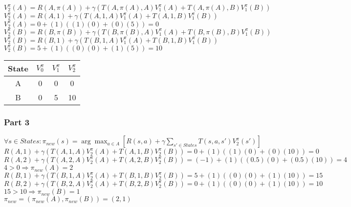\documentclass{article}
\begin{document}
$V^{\pi}_2(A) = R(A, \pi (A)) + \gamma (T(A, \pi (A), A)V^{\pi}_1(A) + T(A, \pi (A), B)V^{\pi}_1(B))$\\

$V^{\pi}_2(A) = R(A, 1) + \gamma (T(A, 1, A)V^{\pi}_1(A) + T(A, 1, B)V^{\pi}_1(B))$\\

$V^{\pi}_2(A) = 0 + (1)((1)(0) + (0)(5)) = 0$\\

$V^{\pi}_2(B) = R(B, \pi (B)) + \gamma (T(B, \pi (B), A)V^{\pi}_1(A) + T(B, \pi (B), B)V^{\pi}_1(B))$\\

$V^{\pi}_2(B) = R(B, 1) + \gamma (T(B, 1, A)V^{\pi}_1(A) + T(B, 1, B)V^{\pi}_1(B))$\\

$V^{\pi}_2(B) = 5 + (1)((0)(0) + (1)(5)) = 10$\\

\begin{table}[!h]
    \centering
    \small
    \begin{tabular}{cccc}
        \hline
         State & $V^{\pi}_0$ & $V^{\pi}_1$ & $V^{\pi}_2$\\
         \hline
         A & 0 & 0 & 0\\
         B & 0 & 5 & 10\\
        \hline
    \end{tabular}
    \label{tab:my_label}
\end{table}

\subsubsection*{Part 3}

$\forall s \in States: \pi_{new}(s) = \arg\max_{a \in A}[R(s,a) + \gamma \sum_{s' \in States} T(s, a, s')V^{\pi}_2(s')]$\\

\noindent 
$R(A, 1) + \gamma (T(A, 1, A)V^{\pi}_2(A) + T(A, 1, B)V^{\pi}_2(B)) = 0 + (1)((1)(0) + (0)(10)) = 0$\\

\noindent 
$R(A, 2) + \gamma (T(A, 2, A)V^{\pi}_2(A) + T(A, 2, B)V^{\pi}_2(B)) = (-1) + (1)((0.5)(0) + (0.5)(10)) = 4$\\

\noindent 
$4 > 0 \Longrightarrow \pi_{new}(A) = 2$\\

\noindent 
$R(B, 1) + \gamma (T(B, 1, A)V^{\pi}_2(A) + T(B, 1, B)V^{\pi}_2(B)) = 5 + (1)((0)(0) + (1)(10)) = 15$\\

\noindent 
$R(B, 2) + \gamma (T(B, 2, A)V^{\pi}_2(A) + T(B, 2, B)V^{\pi}_2(B)) = 0 + (1)((0)(0) + (1)(10)) = 10$\\

\noindent 
$15 > 10 \Longrightarrow \pi_{new}(B) = 1$\\

\noindent
$\pi_{new} = (\pi_{new}(A), \pi_{new}(B)) = (2, 1)$
\end{document}
